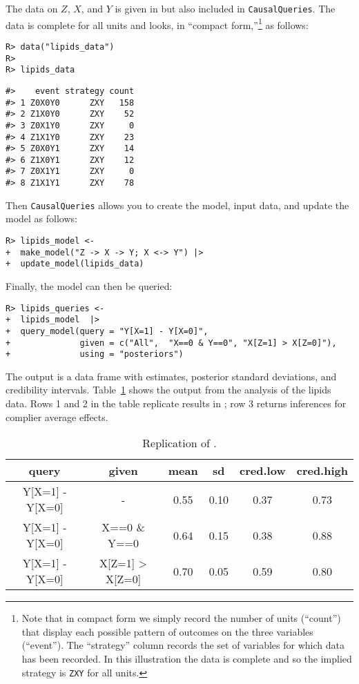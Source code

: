 \documentclass[
  11pt,
  article]{jss}
\begin{document}
The data on \(Z\), \(X\), and \(Y\) is given in
\citet{chickering_clinicians_1996} but also included in
\texttt{CausalQueries}. The data is complete for all units and looks, in
``compact form,''\footnote{Note that in compact form we simply record
  the number of units (``count'') that display each possible pattern of
  outcomes on the three variables (``event''). The ``strategy'' column
  records the set of variables for which data has been recorded. In this
  illustration the data is complete and so the implied strategy is
  \texttt{ZXY} for all units.} as follows:

\begin{verbatim}
R> data("lipids_data")
R> 
R> lipids_data
\end{verbatim}

\begin{verbatim}
#>    event strategy count
#> 1 Z0X0Y0      ZXY   158
#> 2 Z1X0Y0      ZXY    52
#> 3 Z0X1Y0      ZXY     0
#> 4 Z1X1Y0      ZXY    23
#> 5 Z0X0Y1      ZXY    14
#> 6 Z1X0Y1      ZXY    12
#> 7 Z0X1Y1      ZXY     0
#> 8 Z1X1Y1      ZXY    78
\end{verbatim}

Then \texttt{CausalQueries} allows you to create the model, input data,
and update the model as follows:

\begin{verbatim}
R> lipids_model <-  
+  make_model("Z -> X -> Y; X <-> Y") |>
+  update_model(lipids_data)
\end{verbatim}

Finally, the model can then be queried:

\begin{verbatim}
R> lipids_queries <- 
+  lipids_model  |>
+  query_model(query = "Y[X=1] - Y[X=0]",
+              given = c("All",  "X==0 & Y==0", "X[Z=1] > X[Z=0]"),
+              using = "posteriors") 
\end{verbatim}

The output is a data frame with estimates, posterior standard
deviations, and credibility intervals. Table~\ref{tbl-lipids} shows the
output from the analysis of the lipids data. Rows 1 and 2 in the table
replicate results in \citet{chickering_clinicians_1996}; row 3 returns
inferences for complier average effects.

\begin{longtable}[t]{cccccc}

\caption{\label{tbl-lipids}Replication of
\citet{chickering_clinicians_1996}.}

\tabularnewline

\toprule
query & given & mean & sd & cred.low & cred.high\\
\midrule
Y[X=1] - Y[X=0] & - & 0.55 & 0.10 & 0.37 & 0.73\\
Y[X=1] - Y[X=0] & X==0 \& Y==0 & 0.64 & 0.15 & 0.38 & 0.88\\
Y[X=1] - Y[X=0] & X[Z=1] > X[Z=0] & 0.70 & 0.05 & 0.59 & 0.80\\
\bottomrule

\end{longtable}
\end{document}
